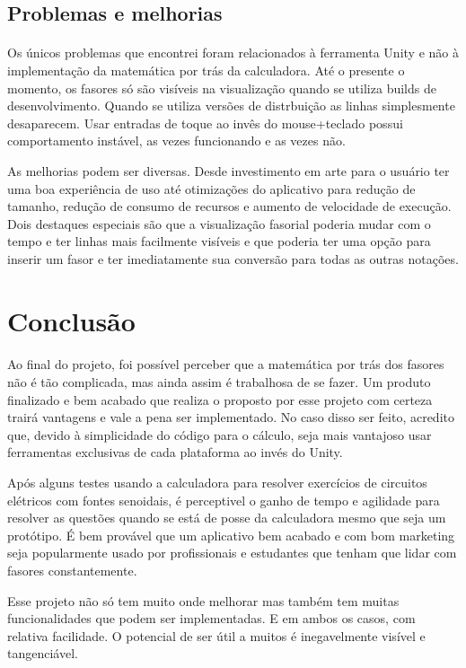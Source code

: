 \documentclass[conference,harvard, brazil]{sbatex}
\begin{document}
	\subsection{Problemas e melhorias}
	\paragraph{}Os únicos problemas que encontrei foram relacionados à ferramenta Unity e não à implementação da matemática por trás da calculadora. Até o presente o momento, os fasores só são visíveis na visualização quando se utiliza { builds} de desenvolvimento. Quando se utiliza versões de distrbuição as linhas simplesmente desaparecem. Usar entradas de toque ao invês do mouse+teclado possui comportamento instável, as vezes funcionando e as vezes não.
	
	As melhorias podem ser diversas. Desde investimento em arte para o usuário ter uma boa experiência de uso até otimizações do aplicativo para redução de tamanho, redução de consumo de recursos e aumento de velocidade de execução. Dois destaques especiais são que a visualização fasorial poderia mudar com o tempo e ter linhas mais facilmente visíveis e que poderia ter uma opção para inserir um fasor e ter imediatamente sua conversão para todas as outras notações.
	
	\section{Conclusão}
	\paragraph{}Ao final do projeto, foi possível perceber que a matemática por trás dos fasores não é tão complicada, mas ainda assim é trabalhosa de se fazer. Um produto finalizado e bem acabado que realiza o proposto por esse projeto com certeza trairá vantagens e vale a pena ser implementado. No caso disso ser feito, acredito que, devido à simplicidade do código para o cálculo, seja mais vantajoso usar ferramentas exclusivas de cada plataforma ao invés do Unity.
	
	Após alguns testes usando a calculadora para resolver exercícios de circuitos elétricos com fontes senoidais, é perceptivel o ganho de tempo e agilidade para resolver as questões quando se está de posse da calculadora mesmo que seja um protótipo. É bem provável que um aplicativo bem acabado e com bom marketing seja popularmente usado por profissionais e estudantes que tenham que lidar com fasores constantemente.
	
	Esse projeto não só tem muito onde melhorar mas também tem muitas funcionalidades que podem ser implementadas. E em ambos os casos, com relativa facilidade. O potencial de ser útil a muitos é inegavelmente visível e tangenciável.

%	
\end{document}
